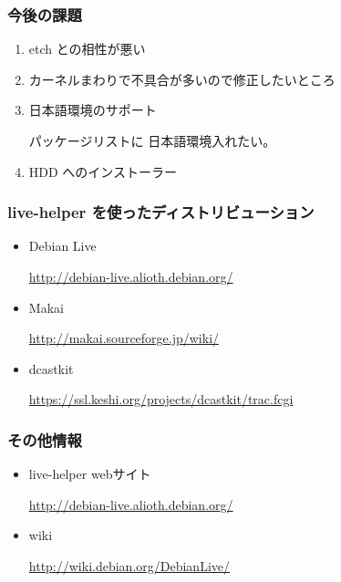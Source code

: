 \documentclass[cjk,dvipdfmx,12pt]{beamer}
\begin{document}
%

\begin{frame}
\frametitle{今後の課題}
\begin{enumerate}
\item etch との相性が悪い
\item カーネルまわりで不具合が多いので修正したいところ
\item 日本語環境のサポート

  パッケージリストに 日本語環境入れたい。

\item HDD へのインストーラー
\end{enumerate}
\end{frame}


\begin{frame}
\frametitle{live-helper を使ったディストリビューション}
\begin{itemize}
\item Debian Live

  \url{http://debian-live.alioth.debian.org/}
\item Makai

  \url{http://makai.sourceforge.jp/wiki/}
\item dcastkit

  \url{https://ssl.keshi.org/projects/dcastkit/trac.fcgi}
\end{itemize}

\end{frame}


\begin{frame}
\frametitle{その他情報}
\begin{itemize}
\item live-helper webサイト

  \url{http://debian-live.alioth.debian.org/}
\item wiki

  \url{http://wiki.debian.org/DebianLive/}
\end{itemize}
\end{frame}
\end{document}
